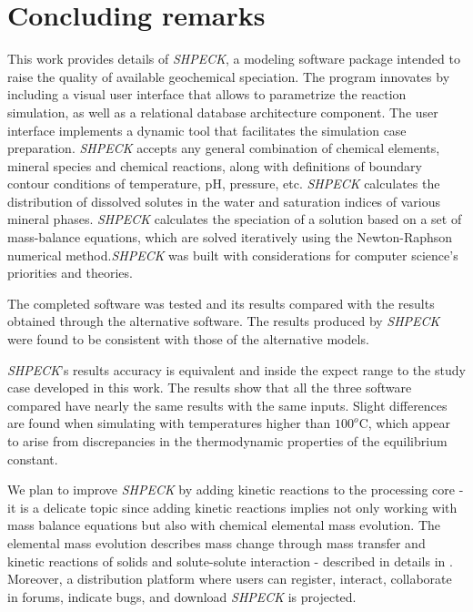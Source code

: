 \documentclass[preprint,12pt,3p]{elsarticle}
\begin{document}
\section{Concluding remarks}
This work provides details of \emph{SHPECK}, a modeling software package intended to raise the quality of available geochemical speciation. The program innovates by including a visual user interface that allows to parametrize the reaction simulation, as well as a relational database architecture component. The user interface implements a dynamic tool that facilitates the simulation case preparation. \emph{SHPECK} accepts any general combination of chemical elements, mineral species and chemical reactions, along with definitions of boundary contour conditions of temperature, pH, pressure, etc.
\emph{SHPECK} calculates the distribution of dissolved solutes in the water and saturation indices of various mineral phases. \emph{SHPECK} calculates the speciation of a solution based on a set of mass-balance equations, which are solved iteratively using the Newton-Raphson numerical method.\emph{SHPECK} was built with considerations for computer science’s priorities and theories.

The completed software was tested and its results compared with the results obtained through the alternative software. The results produced by \emph{SHPECK} were found to be consistent with those of the alternative models.

\emph{SHPECK}'s results accuracy is equivalent and inside the expect range to the study case developed in this work. The results show that all the three software compared have nearly the same results with the same inputs. Slight differences are found when simulating with temperatures higher than $100^o$C, which appear to arise from discrepancies in the thermodynamic properties of the equilibrium constant.

We plan to improve \emph{SHPECK} by adding kinetic reactions to the processing core - it is a delicate topic since adding kinetic reactions implies not only working with mass balance equations but also with chemical elemental mass evolution. The elemental mass evolution describes mass change through mass transfer and kinetic reactions of solids and solute-solute interaction - described in details in \cite{Ajpark:14}.
Moreover, a distribution platform where users can register, interact, collaborate in forums, indicate bugs, and download \emph{SHPECK} is projected.
\end{document}
